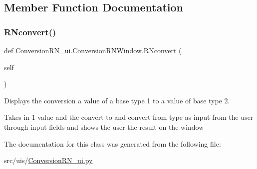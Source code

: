 \subsection{Member Function Documentation}
\mbox{\label{class_conversion_r_n__ui_1_1_conversion_r_n_window_a0c015e92809a27ecde70f4b62e102da4}} 
\subsubsection{\texorpdfstring{R\+Nconvert()}{RNconvert()}}
{\footnotesize\ttfamily def Conversion\+R\+N\+\_\+ui.\+Conversion\+R\+N\+Window.\+R\+Nconvert (\begin{DoxyParamCaption}\item[{}]{self }\end{DoxyParamCaption})}



Displays the conversion a value of a base type 1 to a value of base type 2. 

Takes in 1 value and the convert to and convert from type as input from the user through input fields and shows the user the result on the window 

The documentation for this class was generated from the following file\+:\begin{DoxyCompactItemize}
\item 
src/uis/\hyperlink{_conversion_r_n__ui_8py}{Conversion\+R\+N\+\_\+ui.\+py}\end{DoxyCompactItemize}
